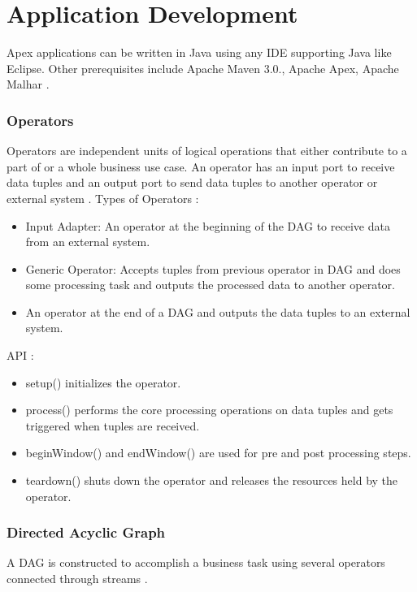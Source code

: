 \documentclass[9pt,twocolumn,twoside]{styles/osajnl}
\begin{document}
\section{Application Development}
Apex applications can be written in Java using any IDE supporting Java like Eclipse.
Other prerequisites include Apache Maven 3.0., Apache Apex, Apache Malhar \cite{www-apacheapexappdevdoc}.

\subsubsection{Operators}
Operators are independent units of logical operations that either contribute to a part of or a whole business use case. An operator has an input port to receive data tuples and an output port to send data tuples to another operator  or external system \cite{www-apacheapexoperatordoc}.
Types of Operators \cite{www-apacheapexoperatordoc}:
\begin{itemize}
  \item Input Adapter:  An operator at the beginning of the DAG to receive data from an external system.
  \item  Generic Operator: Accepts tuples from previous operator in DAG and does some processing task and outputs the processed data to another operator.
  \item An operator at the end of a DAG and outputs the data tuples to an external system. 
  
\end{itemize}

API \cite{www-apacheapexoperatordoc}:
\begin{itemize}
  \item setup() initializes the operator.
  \item process()  performs the core processing operations on data tuples and gets triggered when tuples are received.
  \item beginWindow()  and endWindow() are used for pre and post processing steps.
  \item teardown() shuts down the operator and releases the resources held by the operator.
\end{itemize}
\subsubsection{Directed Acyclic Graph}
A DAG is constructed to accomplish a business task using several operators connected through streams \cite{www-apacheapexappdevdoc}.
\end{document}
